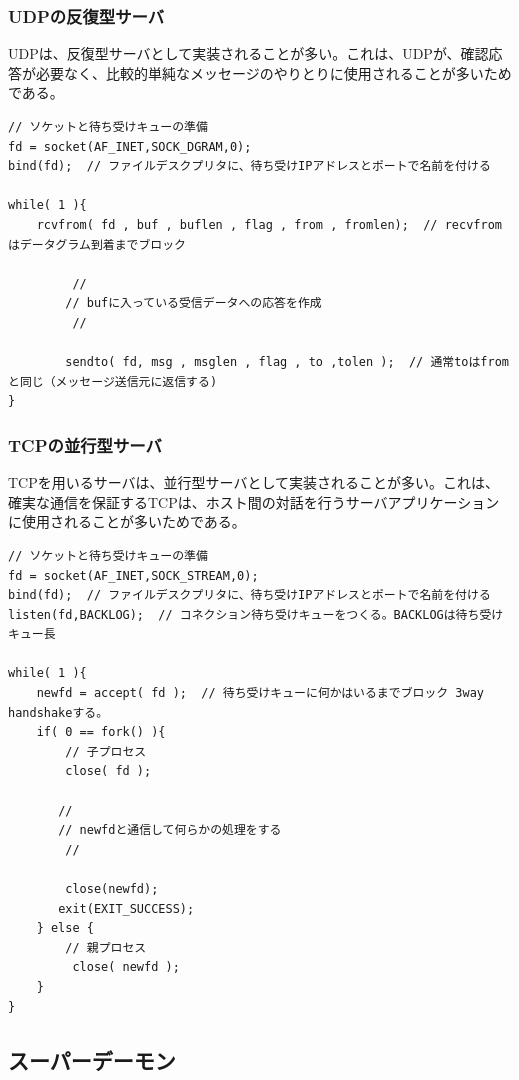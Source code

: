 \subsubsection{UDPの反復型サーバ}
UDPは、反復型サーバとして実装されることが多い。これは、UDPが、確認応答が必要なく、比較的単純なメッセージのやりとりに使用されることが多いためである。

{\scriptsize
\begin{verbatim}
// ソケットと待ち受けキューの準備
fd = socket(AF_INET,SOCK_DGRAM,0);
bind(fd);  // ファイルデスクプリタに、待ち受けIPアドレスとポートで名前を付ける

while( 1 ){
    rcvfrom( fd , buf , buflen , flag , from , fromlen);  // recvfromはデータグラム到着までブロック
 
         //
        // bufに入っている受信データへの応答を作成
         //
 
        sendto( fd, msg , msglen , flag , to ,tolen );  // 通常toはfromと同じ（メッセージ送信元に返信する)
}
\end{verbatim}
}

\subsubsection{TCPの並行型サーバ}
TCPを用いるサーバは、並行型サーバとして実装されることが多い。これは、確実な通信を保証するTCPは、ホスト間の対話を行うサーバアプリケーションに使用されることが多いためである。

{\scriptsize
\begin{verbatim}
// ソケットと待ち受けキューの準備
fd = socket(AF_INET,SOCK_STREAM,0);
bind(fd);  // ファイルデスクプリタに、待ち受けIPアドレスとポートで名前を付ける
listen(fd,BACKLOG);  // コネクション待ち受けキューをつくる。BACKLOGは待ち受けキュー長

while( 1 ){
    newfd = accept( fd );  // 待ち受けキューに何かはいるまでブロック 3way handshakeする。
    if( 0 == fork() ){
        // 子プロセス
        close( fd );

       //
       // newfdと通信して何らかの処理をする
        //

        close(newfd);
       exit(EXIT_SUCCESS);
    } else {
        // 親プロセス
         close( newfd );
    }
}
\end{verbatim}
}


\subsection{スーパーデーモン}


